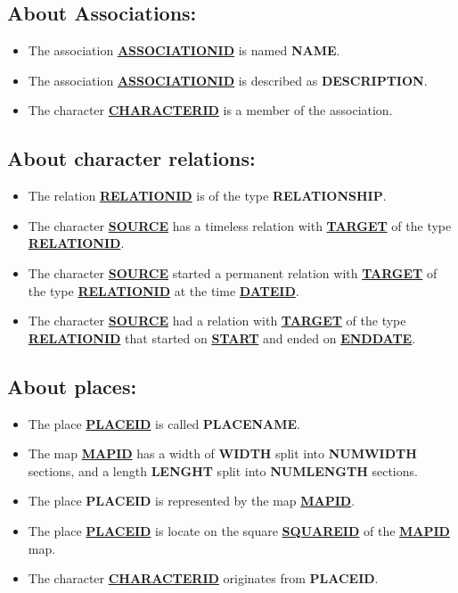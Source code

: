 \documentclass[a4paper ,12pt,french]{article}
\begin{document}
\subsection*{About Associations:}
\begin{itemize}
\item The association \underline{\textbf{ASSOCIATIONID}} is named \textbf{NAME}.
\item The association \underline{\textbf{ASSOCIATIONID}} is described as \textbf{DESCRIPTION}.
\item The character \underline{\textbf{CHARACTERID}} is a member of the association.
\end{itemize}

\subsection*{About character relations:}
\begin{itemize}
\item The relation \underline{\textbf{RELATIONID}} is of the type \textbf{RELATIONSHIP}.
\item The character \underline{\textbf{SOURCE}} has a timeless relation with \underline{\textbf{TARGET}} of the type \underline{\textbf{RELATIONID}}.
\item The character \underline{\textbf{SOURCE}} started a permanent relation with \underline{\textbf{TARGET}} of the type \underline{\textbf{RELATIONID}} at the time \underline{\textbf{DATEID}}.
\item The character \underline{\textbf{SOURCE}} had a relation with \underline{\textbf{TARGET}} of the type \underline{\textbf{RELATIONID}} that started on \underline{\textbf{START}} and ended on \underline{\textbf{ENDDATE}}.
\end{itemize}

\subsection*{About places:}
\begin{itemize}
\item The place \underline{\textbf{PLACEID}} is called \textbf{PLACENAME}.
\item The map \underline{\textbf{MAPID}} has a width of \textbf{WIDTH} split into \textbf{NUMWIDTH} sections, and a length \textbf{LENGHT} split into \textbf{NUMLENGTH} sections.
\item The place \textbf{PLACEID} is represented by the map \underline{\textbf{MAPID}}.
\item The place \underline{\textbf{PLACEID}} is locate on the square \underline{\textbf{SQUAREID}} of the \underline{\textbf{MAPID}} map.
\item The character \underline{\textbf{CHARACTERID}} originates from \textbf{PLACEID}.
\end{itemize}
\end{document}
